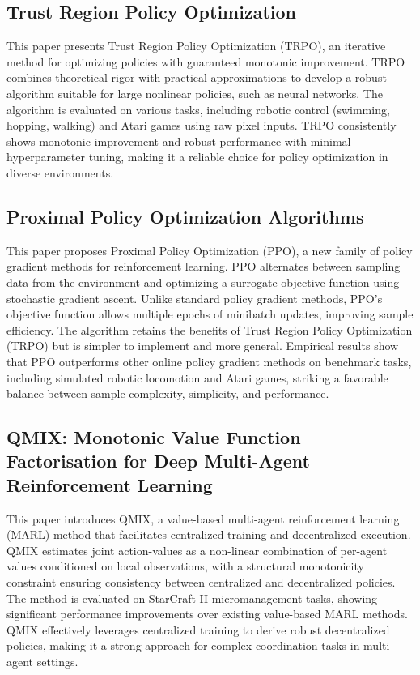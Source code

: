\documentclass[journal]{IEEEtran}
\begin{document}
\subsection{Trust Region Policy Optimization}
This paper presents Trust Region Policy Optimization (TRPO), an iterative method for optimizing policies with guaranteed monotonic improvement. TRPO combines theoretical rigor with practical approximations to develop a robust algorithm suitable for large nonlinear policies, such as neural networks. The algorithm is evaluated on various tasks, including robotic control (swimming, hopping, walking) and Atari games using raw pixel inputs. TRPO consistently shows monotonic improvement and robust performance with minimal hyperparameter tuning, making it a reliable choice for policy optimization in diverse environments.
\cite{schulman2017}

\subsection{Proximal Policy Optimization Algorithms}
This paper proposes Proximal Policy Optimization (PPO), a new family of policy gradient methods for reinforcement learning. PPO alternates between sampling data from the environment and optimizing a surrogate objective function using stochastic gradient ascent. Unlike standard policy gradient methods, PPO's objective function allows multiple epochs of minibatch updates, improving sample efficiency. The algorithm retains the benefits of Trust Region Policy Optimization (TRPO) but is simpler to implement and more general. Empirical results show that PPO outperforms other online policy gradient methods on benchmark tasks, including simulated robotic locomotion and Atari games, striking a favorable balance between sample complexity, simplicity, and performance.
\cite{schulman2017a}

\subsection{QMIX: Monotonic Value Function Factorisation for Deep Multi-Agent Reinforcement Learning}
This paper introduces QMIX, a value-based multi-agent reinforcement learning (MARL) method that facilitates centralized training and decentralized execution. QMIX estimates joint action-values as a non-linear combination of per-agent values conditioned on local observations, with a structural monotonicity constraint ensuring consistency between centralized and decentralized policies. The method is evaluated on StarCraft II micromanagement tasks, showing significant performance improvements over existing value-based MARL methods. QMIX effectively leverages centralized training to derive robust decentralized policies, making it a strong approach for complex coordination tasks in multi-agent settings.
\cite{rashid2018}
\end{document}
